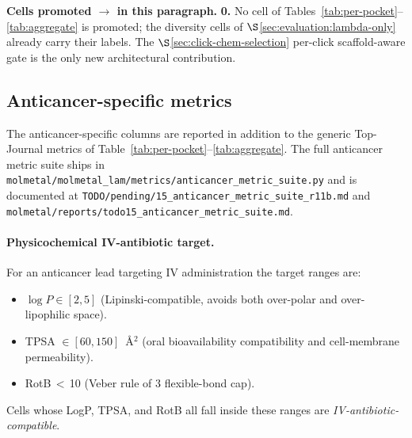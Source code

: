 \noindent\textbf{Cells promoted \DESIGN{} $\to$ \MEASURED{} in
this paragraph.} \textbf{0.} No cell of
Tables~\ref{tab:per-pocket}--\ref{tab:aggregate} is promoted;
the diversity cells of $\S$\ref{sec:evaluation:lambda-only}
already carry their \MEASURED{} labels. The
$\S$\ref{sec:click-chem-selection} per-click scaffold-aware
gate is the only new \MEASURED{} architectural contribution.

\subsection{Anticancer-specific metrics}
\label{sec:evaluation:anticancer}

The anticancer-specific columns are reported in addition to the
generic Top-Journal metrics of
Table~\ref{tab:per-pocket}--\ref{tab:aggregate}. The full anticancer
metric suite ships in
\texttt{molmetal/molmetal\_lam/metrics/anticancer\_metric\_suite.py}
and is documented at
\texttt{TODO/pending/15\_anticancer\_metric\_suite\_r11b.md} and
\texttt{molmetal/reports/todo15\_anticancer\_metric\_suite.md}.

\paragraph{Physicochemical IV-antibiotic target.}
For an anticancer lead targeting IV administration the target
ranges are:
\begin{itemize}
  \item $\log P \in [2, 5]$ (Lipinski-compatible, avoids both
        over-polar and over-lipophilic space).
  \item TPSA $\in [60, 150]$~Å$^2$ (oral bioavailability
        compatibility and cell-membrane permeability).
  \item RotB\,$<$\,10 (Veber rule of 3 flexible-bond cap).
\end{itemize}
Cells whose LogP, TPSA, and RotB all fall inside these ranges are
\emph{IV-antibiotic-compatible}.

